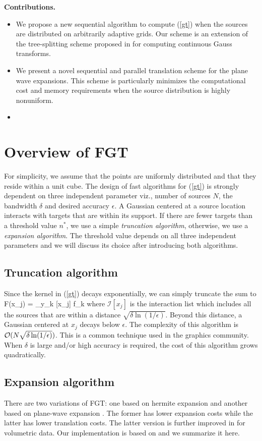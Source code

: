 \documentclass[conference]{IEEEtran}
\begin{document}
\textbf{Contributions.}
\begin{itemize} 
\item We propose a new sequential algorithm to compute (\ref{gt}) when the sources are distributed on arbitrarily adaptive grids. Our scheme is an extension of the tree-splitting scheme proposed in \cite{veerapaneni08} for computing continuous Gauss transforms. 
\item We present a novel sequential and parallel translation scheme for the plane wave expansions.
This scheme is particularly minimizes the computational cost and memory requirements 
when the source distribution is highly nonuniform. 
\item 
\end{itemize}


\section{Overview of FGT}
For simplicity, we assume that the points are uniformly distributed and that they reside within a unit cube.
The design of fast algorithms for (\ref{gt}) is strongly dependent on three independent parameter viz., number of sources $N$, the bandwidth $\delta$ and desired accuracy $\epsilon$. A Gaussian centered at a source location interacts with targets that are within its support. If there are fewer targets than a threshold value $n^*$, we use a simple {\em truncation algorithm}, otherwise, we use a {\em expansion algorithm}. The threshold  value depends on all three independent parameters and we will discuss its choice after introducing both algorithms. 

\subsection{Truncation algorithm} 
Since the kernel in (\ref{gt}) decays exponentially, we can simply truncate the sum to
%
\beq F(x_j) = \sum_{y_k \in {}[x_j]}  f_k \eeq
%
where $\mathcal{I}[x_j]$ is the interaction list which includes all the sources that are within a distance $\sqrt{\delta \ln (1/\epsilon)}$. Beyond this distance, a Gaussian centered at $x_j$ decays below $\epsilon$. The complexity of this algorithm is $\mathcal{O}(N \sqrt{\delta \ln(1/\epsilon)})$. This is a common technique used in the graphics community. When $\delta$ is large and/or high accuracy is required, the cost of this algorithm grows quadratically.  

\subsection{Expansion algorithm}
There are two variations of FGT: one based on hermite expansion \cite{fgt} and another based on plane-wave expansion \cite{greengard98}. The former has lower expansion costs while the latter has lower translation costs. The latter version is further improved in \cite{fggt} for volumetric data. Our implementation is based on \cite{fggt} and we summarize it here. 
\end{document}
